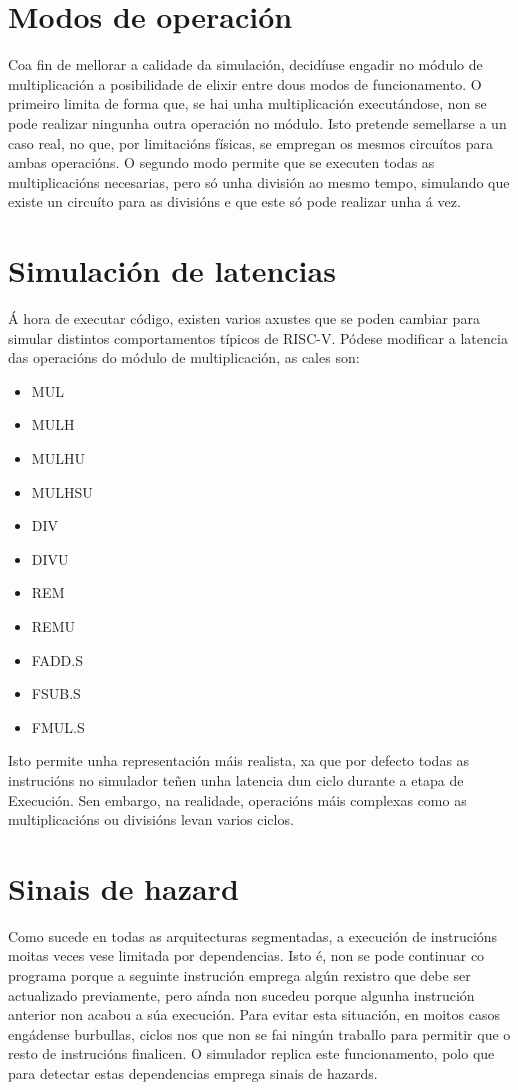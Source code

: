 \section{Modos de operación}\label{sec:modos_op}
Coa fin de mellorar a calidade da simulación, decidíuse engadir no módulo de multiplicación a posibilidade de elixir entre dous modos de funcionamento. O primeiro limita de forma que, se hai unha multiplicación executándose, non se pode realizar ningunha outra operación no módulo. Isto pretende semellarse a un caso real, no que, por limitacións físicas, se empregan os mesmos circuítos para ambas operacións. O segundo modo permite que se executen todas as multiplicacións necesarias, pero só unha división ao mesmo tempo, simulando que existe un circuíto para as divisións e que este só pode realizar unha á vez.


\section{Simulación de latencias}\label{sec:sim_latencias}
Á hora de executar código, existen varios axustes que se poden cambiar para simular distintos comportamentos típicos de RISC-V. Pódese modificar a latencia  das operacións do módulo de multiplicación, as cales son: 
\begin{itemize}
    \item MUL
    \item MULH
    \item MULHU
    \item MULHSU
    \item DIV
    \item DIVU
    \item REM
    \item REMU
    \item FADD.S
    \item FSUB.S
    \item FMUL.S
\end{itemize}
Isto permite unha representación máis realista, xa que por defecto todas as instrucións no simulador teñen unha latencia dun ciclo durante a etapa de Execución. Sen embargo, na realidade, operacións máis complexas como as multiplicacións ou divisións levan varios ciclos.

\section{Sinais de hazard}\label{sec:hazards}
Como sucede en todas as \gls{arquitecturas} segmentadas, a execución de instrucións moitas veces vese limitada por dependencias. Isto é, non se pode continuar co programa porque a seguinte instrución emprega algún rexistro que debe ser actualizado previamente, pero aínda non sucedeu porque algunha instrución anterior non acabou a súa execución. Para evitar esta situación, en moitos casos engádense burbullas, ciclos nos que non se fai ningún traballo para permitir que o resto de instrucións finalicen. O simulador replica este funcionamento, polo que para detectar estas dependencias emprega sinais de \gls{hazards}.


